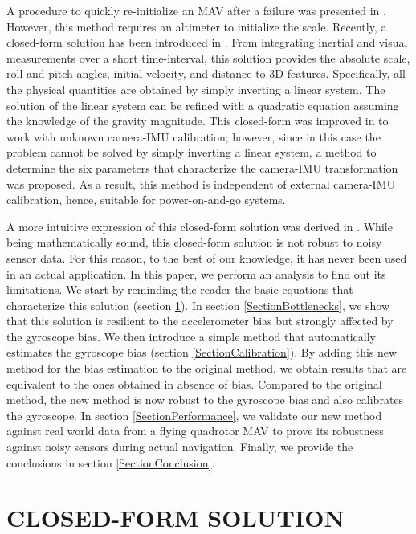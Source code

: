 \documentclass[letterpaper, 10 pt, journal, twoside]{IEEEtran}  %
\begin{document}

A procedure to quickly re-initialize an MAV after a failure was presented in \cite{Faessler2015}.
However, this method requires an altimeter to initialize the scale.
Recently, a closed-form solution has been introduced in \cite{Martinelli2012}.
From integrating inertial and visual measurements over a short time-interval, this solution provides the absolute scale, roll and pitch angles, initial velocity, and distance to 3D features.
Specifically, all the physical quantities are obtained by simply inverting a linear system.
The solution of the linear system can be refined with a quadratic equation assuming the knowledge of the gravity magnitude.
This closed-form was improved in \cite{DongSi2012} to work with unknown camera-IMU calibration;
however, since in this case the problem cannot be solved by simply inverting a linear system, a method to determine the six parameters that characterize the camera-IMU transformation was proposed.
As a result, this method is independent of external camera-IMU calibration, hence, suitable for power-on-and-go systems.

A more intuitive expression of this closed-form solution was derived in \cite{Martinelli2014}.
While being mathematically sound, this closed-form solution is not robust to noisy sensor data.
For this reason, to the best of our knowledge, it has never been used in an actual application.
In this paper, we perform an analysis to find out its limitations. We start by reminding the reader the basic equations that characterize this solution (section \ref{SectionCFS}).
In section \ref{SectionBottlenecks}, we show that this solution is resilient to the accelerometer bias but strongly affected by the gyroscope bias.
We then introduce a simple method that automatically estimates the gyroscope bias (section \ref{SectionCalibration}).
By adding this new method for the bias estimation to the original method, we obtain results that are equivalent to the ones obtained in absence of bias.
Compared to the original method, the new method is now robust to the gyroscope bias and also calibrates the gyroscope.
In section \ref{SectionPerformance}, we validate our new method against real world data from a flying quadrotor MAV to prove its robustness against noisy sensors during actual navigation.
Finally, we provide the conclusions in section \ref{SectionConclusion}.

\section{CLOSED-FORM SOLUTION}\label{SectionCFS}
\end{document}

